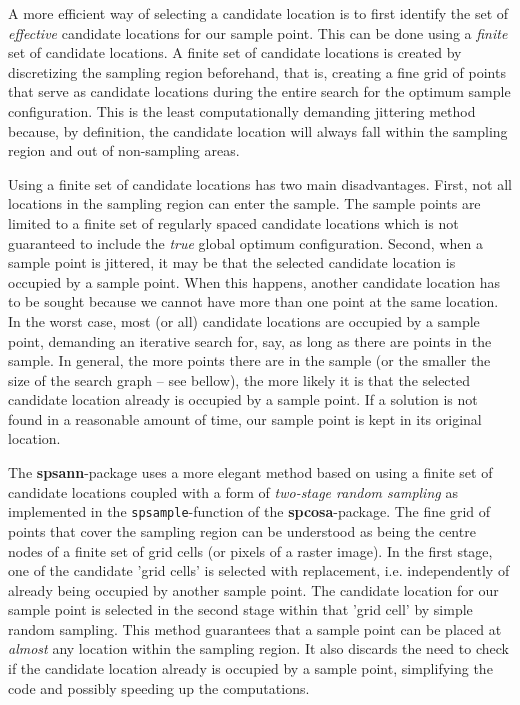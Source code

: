 A more efficient way of selecting a candidate location is to first identify the
set of \textit{effective} candidate locations for our sample point. This can be
done using a \textit{finite} set of candidate locations. A finite set of 
candidate locations is created by discretizing the sampling region beforehand, 
that is, creating a fine grid of points that serve as candidate locations during
the entire search for the optimum sample configuration. This is the least 
computationally demanding jittering method because, by definition, the candidate
location will always fall within the sampling region and out of non-sampling 
areas.

Using a finite set of candidate locations has two main disadvantages. First, not
all locations in the sampling region can enter the sample. The sample points are
limited to a finite set of regularly spaced candidate locations which is not 
guaranteed to include the \textit{true} global optimum configuration. Second, 
when a sample point is jittered, it may be that the selected candidate location
is occupied by a sample point. When this happens, another candidate location 
has to be sought because we cannot have more than one point at the same 
location. In the worst case, most (or all) candidate locations are occupied by 
a sample point, demanding an iterative search for, say, as long as there are 
points in the sample. In general, the more points there are in the sample (or 
the smaller the size of the search graph -- see bellow), the more likely it is 
that the selected candidate location already is occupied by a sample point. If 
a solution is not found in a reasonable amount of time, our sample point is 
kept in its original location.

The \textbf{spsann}-package uses a more elegant method based on using a finite
set of candidate locations coupled with a form of \textit{two-stage random 
sampling} as implemented in the \texttt{spsample}-function of the 
\textbf{spcosa}-package. The fine grid of points that cover the sampling region
can be understood as being the centre nodes of a finite set of grid cells (or 
pixels of a raster image). In the first stage, one of the candidate 'grid cells'
is selected with replacement, i.e. independently of already being occupied by 
another sample point. The candidate location for our sample point is selected
in the second stage within that 'grid cell' by simple random sampling. This 
method guarantees that a sample point can be placed at \textit{almost} any 
location within the sampling region. It also discards the need to check if the 
candidate location already is occupied by a sample point, simplifying the code 
and possibly speeding up the computations.





